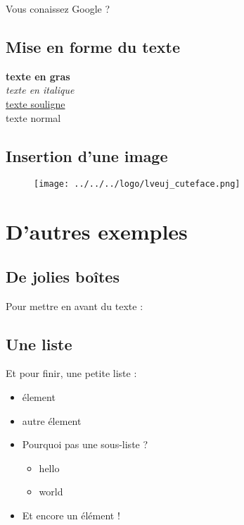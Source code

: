 \documentclass{life-fr}
\begin{document}
     Vous conaissez Google ?

   \section{Mise en forme du texte}
     \textbf{texte en gras}\\
     \textit{texte en italique}\\
     \underline{texte souligne}\\
     texte normal

   \section{Insertion d'une image}
     \begin{figure}[H]
      \begin{center}
        \texttt{[image: ../../../logo/lveuj\_cuteface.png]}
      \end{center}
    \end{figure} 

 \chapter{D'autres exemples}
 
   \section{De jolies boîtes}
     Pour mettre en avant du texte :
     \newpage 

   \section{Une liste}
     Et pour finir, une petite liste :
     \begin{itemize}
      \item élement
      \item autre élement
      \item Pourquoi pas une sous-liste ?
        \begin{itemize}
          \item hello
          \item world
        \end{itemize}
      \item Et encore un élément !
     \end{itemize}
\end{document}
